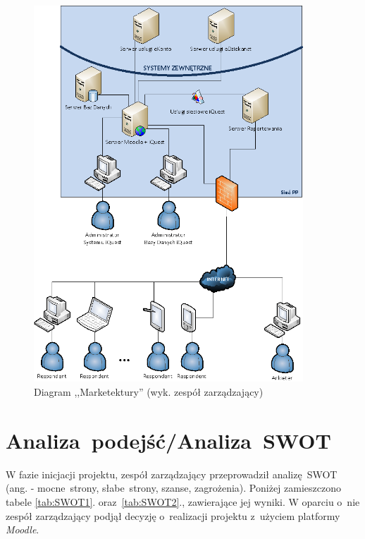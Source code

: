 \begin{figure}[H]
\centering\includegraphics[width=0.9\textwidth]{figures/marketecture}
\caption{Diagram ,,Marketektury'' (wyk. zespół zarządzający)}\label{rys:marketecture}
\end{figure}

\section{Analiza~podejść\slash Analiza~SWOT}
\label{Chapter53}

W fazie inicjacji projektu, zespół zarządzający przeprowadził analizę~SWOT (ang.  - mocne~strony, słabe~strony, szanse, zagrożenia). Poniżej zamieszczono tabele \ref{tab:SWOT1}. oraz~\ref{tab:SWOT2}., zawierające jej wyniki. W oparciu o~nie zespół zarządzający podjął decyzję o~realizacji projektu z~użyciem platformy \textit{Moodle}.

